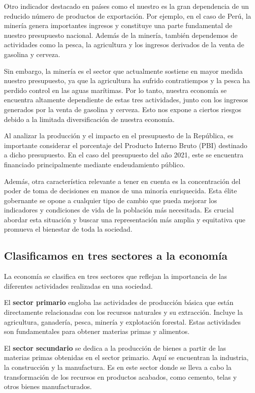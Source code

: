 \documentclass[
  a4paper,
]{article}
\begin{document}
Otro indicador destacado en países como el nuestro es la gran
dependencia de un reducido número de productos de exportación. Por
ejemplo, en el caso de Perú, la minería genera importantes ingresos y
constituye una parte fundamental de nuestro presupuesto nacional. Además
de la minería, también dependemos de actividades como la pesca, la
agricultura y los ingresos derivados de la venta de gasolina y cerveza.

Sin embargo, la minería es el sector que actualmente sostiene en mayor
medida nuestro presupuesto, ya que la agricultura ha sufrido
contratiempos y la pesca ha perdido control en las aguas marítimas. Por
lo tanto, nuestra economía se encuentra altamente dependiente de estas
tres actividades, junto con los ingresos generados por la venta de
gasolina y cerveza. Esto nos expone a ciertos riesgos debido a la
limitada diversificación de nuestra economía.

Al analizar la producción y el impacto en el presupuesto de la
República, es importante considerar el porcentaje del Producto Interno
Bruto (PBI) destinado a dicho presupuesto. En el caso del presupuesto
del año 2021, este se encuentra financiado principalmente mediante
endeudamiento público.

Además, otra característica relevante a tener en cuenta es la
concentración del poder de toma de decisiones en manos de una minoría
enriquecida. Esta élite gobernante se opone a cualquier tipo de cambio
que pueda mejorar los indicadores y condiciones de vida de la población
más necesitada. Es crucial abordar esta situación y buscar una
representación más amplia y equitativa que promueva el bienestar de toda
la sociedad.

\subsection{Clasificamos en tres sectores a la
economía}\label{clasificamos-en-tres-sectores-a-la-economuxeda}

La economía se clasifica en tres sectores que reflejan la importancia de
las diferentes actividades realizadas en una sociedad.

El \textbf{sector primario} engloba las actividades de producción básica
que están directamente relacionadas con los recursos naturales y su
extracción. Incluye la agricultura, ganadería, pesca, minería y
explotación forestal. Estas actividades son fundamentales para obtener
materias primas y alimentos.

El \textbf{sector secundario} se dedica a la producción de bienes a
partir de las materias primas obtenidas en el sector primario. Aquí se
encuentran la industria, la construcción y la manufactura. Es en este
sector donde se lleva a cabo la transformación de los recursos en
productos acabados, como cemento, telas y otros bienes manufacturados.
\end{document}
